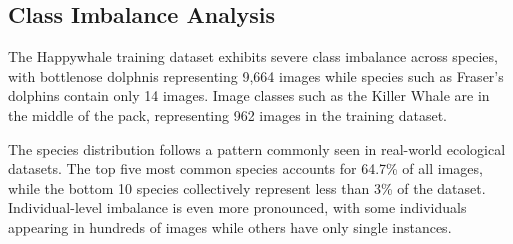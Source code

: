\documentclass[twocolumn]{article}
\begin{document}
\subsection{Class Imbalance Analysis}

The Happywhale training dataset exhibits severe class imbalance across species, with bottlenose dolphnis representing 9,664 images while species such as Fraser's dolphins contain only 14 images.  Image classes such as the Killer Whale are in the middle of the pack, representing 962 images in the training dataset. 

The species distribution follows a pattern commonly seen in real-world ecological datasets. The top five most common species accounts for 64.7\% of all images, while the bottom 10 species collectively represent less than 3\% of the dataset. Individual-level imbalance is even more pronounced, with some individuals appearing in hundreds of images while others have only single instances. 
\end{document}
